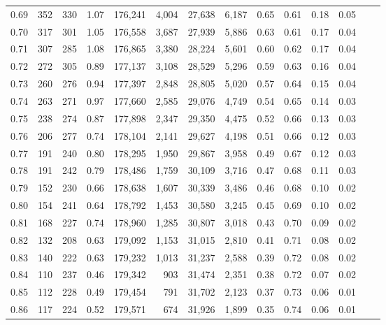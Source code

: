 \begin{tabular}{rrrrrrrrrrrrrr}
0.69 &    352 &  330 &    1.07 &  176,241 &    4,004 &  27,638 &   6,187 &  0.65 &  0.61 &  0.18 &      0.05 \\
0.70 &    317 &  301 &    1.05 &  176,558 &    3,687 &  27,939 &   5,886 &  0.63 &  0.61 &  0.17 &      0.04 \\
0.71 &    307 &  285 &    1.08 &  176,865 &    3,380 &  28,224 &   5,601 &  0.60 &  0.62 &  0.17 &      0.04 \\
0.72 &    272 &  305 &    0.89 &  177,137 &    3,108 &  28,529 &   5,296 &  0.59 &  0.63 &  0.16 &      0.04 \\
0.73 &    260 &  276 &    0.94 &  177,397 &    2,848 &  28,805 &   5,020 &  0.57 &  0.64 &  0.15 &      0.04 \\
0.74 &    263 &  271 &    0.97 &  177,660 &    2,585 &  29,076 &   4,749 &  0.54 &  0.65 &  0.14 &      0.03 \\
0.75 &    238 &  274 &    0.87 &  177,898 &    2,347 &  29,350 &   4,475 &  0.52 &  0.66 &  0.13 &      0.03 \\
0.76 &    206 &  277 &    0.74 &  178,104 &    2,141 &  29,627 &   4,198 &  0.51 &  0.66 &  0.12 &      0.03 \\
0.77 &    191 &  240 &    0.80 &  178,295 &    1,950 &  29,867 &   3,958 &  0.49 &  0.67 &  0.12 &      0.03 \\
0.78 &    191 &  242 &    0.79 &  178,486 &    1,759 &  30,109 &   3,716 &  0.47 &  0.68 &  0.11 &      0.03 \\
0.79 &    152 &  230 &    0.66 &  178,638 &    1,607 &  30,339 &   3,486 &  0.46 &  0.68 &  0.10 &      0.02 \\
0.80 &    154 &  241 &    0.64 &  178,792 &    1,453 &  30,580 &   3,245 &  0.45 &  0.69 &  0.10 &      0.02 \\
0.81 &    168 &  227 &    0.74 &  178,960 &    1,285 &  30,807 &   3,018 &  0.43 &  0.70 &  0.09 &      0.02 \\
0.82 &    132 &  208 &    0.63 &  179,092 &    1,153 &  31,015 &   2,810 &  0.41 &  0.71 &  0.08 &      0.02 \\
0.83 &    140 &  222 &    0.63 &  179,232 &    1,013 &  31,237 &   2,588 &  0.39 &  0.72 &  0.08 &      0.02 \\
0.84 &    110 &  237 &    0.46 &  179,342 &      903 &  31,474 &   2,351 &  0.38 &  0.72 &  0.07 &      0.02 \\
0.85 &    112 &  228 &    0.49 &  179,454 &      791 &  31,702 &   2,123 &  0.37 &  0.73 &  0.06 &      0.01 \\
0.86 &    117 &  224 &    0.52 &  179,571 &      674 &  31,926 &   1,899 &  0.35 &  0.74 &  0.06 &      0.01 \\

\end{tabular}
